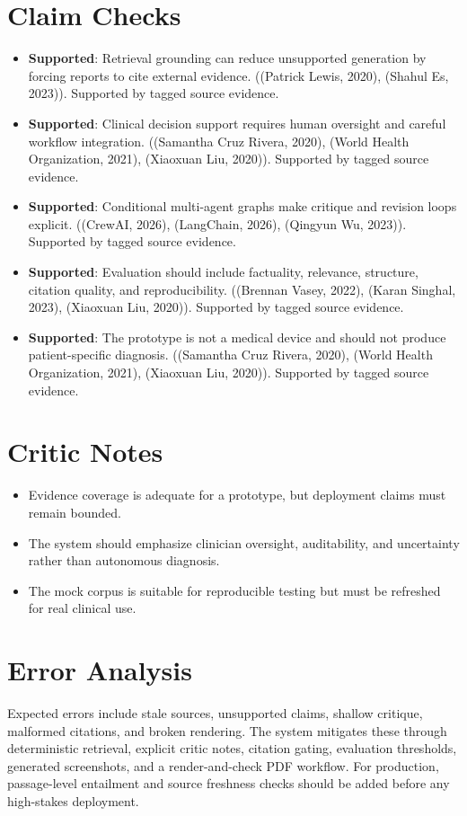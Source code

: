 \documentclass[11pt]{article}
\begin{document}
\section{Claim Checks}
\begin{itemize}
\item \textbf{Supported}: Retrieval grounding can reduce unsupported generation by forcing reports to cite external evidence. ((Patrick Lewis, 2020), (Shahul Es, 2023)). Supported by tagged source evidence.
\item \textbf{Supported}: Clinical decision support requires human oversight and careful workflow integration. ((Samantha Cruz Rivera, 2020), (World Health Organization, 2021), (Xiaoxuan Liu, 2020)). Supported by tagged source evidence.
\item \textbf{Supported}: Conditional multi-agent graphs make critique and revision loops explicit. ((CrewAI, 2026), (LangChain, 2026), (Qingyun Wu, 2023)). Supported by tagged source evidence.
\item \textbf{Supported}: Evaluation should include factuality, relevance, structure, citation quality, and reproducibility. ((Brennan Vasey, 2022), (Karan Singhal, 2023), (Xiaoxuan Liu, 2020)). Supported by tagged source evidence.
\item \textbf{Supported}: The prototype is not a medical device and should not produce patient-specific diagnosis. ((Samantha Cruz Rivera, 2020), (World Health Organization, 2021), (Xiaoxuan Liu, 2020)). Supported by tagged source evidence.
\end{itemize}

\section{Critic Notes}
\begin{itemize}
\item Evidence coverage is adequate for a prototype, but deployment claims must remain bounded.
\item The system should emphasize clinician oversight, auditability, and uncertainty rather than autonomous diagnosis.
\item The mock corpus is suitable for reproducible testing but must be refreshed for real clinical use.
\end{itemize}

\section{Error Analysis}
Expected errors include stale sources, unsupported claims, shallow critique, malformed citations, and broken rendering. The system mitigates these through deterministic retrieval, explicit critic notes, citation gating, evaluation thresholds, generated screenshots, and a render-and-check PDF workflow. For production, passage-level entailment and source freshness checks should be added before any high-stakes deployment.
\end{document}
